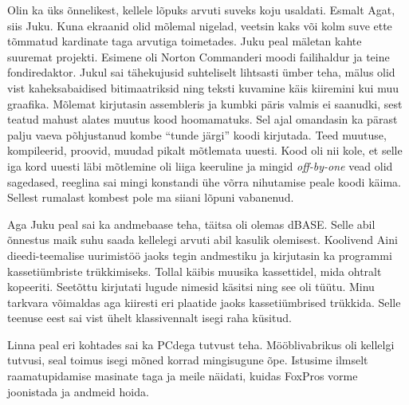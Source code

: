 Olin ka üks õnnelikest, kellele lõpuks arvuti suveks koju usaldati. Esmalt Agat, siis Juku. Kuna ekraanid olid mõlemal nigelad, veetsin kaks või kolm suve ette tõmmatud kardinate taga arvutiga toimetades. Juku peal mäletan kahte suuremat projekti. Esimene oli Norton Commanderi moodi failihaldur ja teine fondiredaktor. Jukul sai tähekujusid suhteliselt lihtsasti ümber teha, mälus olid vist kaheksabaidised bitimaatriksid ning teksti kuvamine käis kiiremini kui muu graafika. Mõlemat kirjutasin assembleris ja kumbki päris valmis ei saanudki, sest teatud mahust alates muutus kood hoomamatuks. Sel ajal omandasin ka pärast palju vaeva põhjustanud kombe \enquote{tunde järgi} koodi kirjutada. Teed muutuse, kompileerid, proovid, muudad pikalt mõtlemata uuesti. Kood oli nii kole, et selle iga kord uuesti läbi mõtlemine oli liiga keeruline ja mingid \emph{off-by-one} vead olid sagedased, reeglina sai mingi konstandi ühe võrra nihutamise peale koodi käima. Sellest rumalast kombest pole ma siiani lõpuni vabanenud. 

Aga Juku peal sai ka andmebaase teha, täitsa oli olemas dBASE. Selle abil õnnestus maik suhu saada kellelegi arvuti abil kasulik olemisest. Koolivend Aini dieedi-teemalise uurimistöö jaoks tegin andmestiku ja kirjutasin ka programmi kassetiümbriste trükkimiseks. Tollal käibis muusika kassettidel, mida ohtralt kopeeriti. Seetõttu kirjutati lugude nimesid käsitsi ning see oli tüütu. Minu tarkvara võimaldas aga kiiresti eri plaatide jaoks kassetiümbrised trükkida. Selle teenuse eest sai vist ühelt klassivennalt isegi raha küsitud.

Linna peal eri kohtades sai ka PCdega tutvust teha. Mööblivabrikus oli kellelgi tutvusi, seal toimus isegi mõned korrad mingisugune õpe. Istusime ilmselt raamatupidamise masinate taga ja meile näidati, kuidas FoxPros vorme joonistada ja andmeid hoida. 

